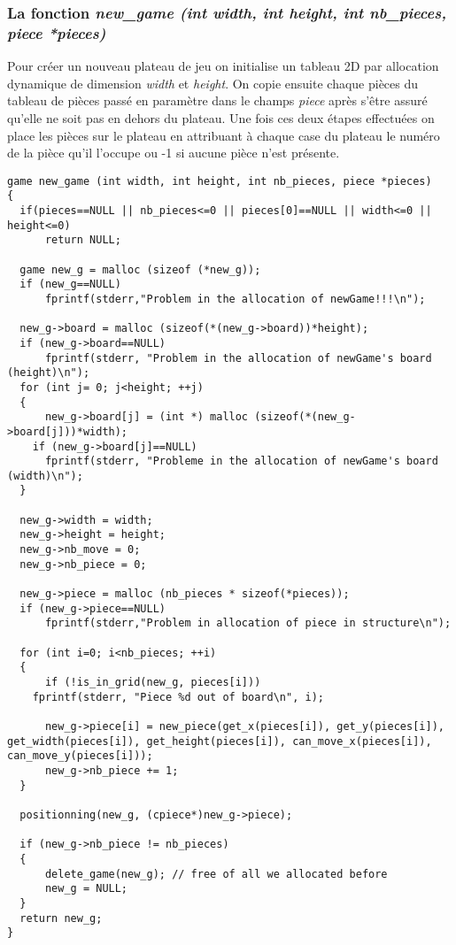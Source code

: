 \documentclass{report}
\begin{document}
\subsubsection{La fonction \textit{new\_game (int width, int height, int nb\_pieces, piece *pieces)}}
Pour créer un nouveau plateau de jeu on initialise un tableau 2D par allocation dynamique de dimension \textit{width} et \textit{height}. On copie ensuite chaque pièces du tableau de pièces passé en paramètre dans le champs \textit{piece} après s'être assuré qu'elle ne soit pas en dehors du plateau. Une fois ces deux étapes effectuées on place les pièces sur le plateau en attribuant à chaque case du plateau le numéro de la pièce qu'il l'occupe ou -1 si aucune pièce n'est présente.
\begin{lstlisting}
game new_game (int width, int height, int nb_pieces, piece *pieces)
{
  if(pieces==NULL || nb_pieces<=0 || pieces[0]==NULL || width<=0 || height<=0)
      return NULL;

  game new_g = malloc (sizeof (*new_g));
  if (new_g==NULL)
      fprintf(stderr,"Problem in the allocation of newGame!!!\n");

  new_g->board = malloc (sizeof(*(new_g->board))*height);
  if (new_g->board==NULL)
      fprintf(stderr, "Problem in the allocation of newGame's board (height)\n");
  for (int j= 0; j<height; ++j)
  {
      new_g->board[j] = (int *) malloc (sizeof(*(new_g->board[j]))*width);
    if (new_g->board[j]==NULL)
      fprintf(stderr, "Probleme in the allocation of newGame's board (width)\n");
  }

  new_g->width = width;
  new_g->height = height;
  new_g->nb_move = 0;
  new_g->nb_piece = 0;

  new_g->piece = malloc (nb_pieces * sizeof(*pieces));
  if (new_g->piece==NULL)
      fprintf(stderr,"Problem in allocation of piece in structure\n");
     
  for (int i=0; i<nb_pieces; ++i)
  {
      if (!is_in_grid(new_g, pieces[i]))
	fprintf(stderr, "Piece %d out of board\n", i);

      new_g->piece[i] = new_piece(get_x(pieces[i]), get_y(pieces[i]), get_width(pieces[i]), get_height(pieces[i]), can_move_x(pieces[i]), can_move_y(pieces[i]));
      new_g->nb_piece += 1;
  }

  positionning(new_g, (cpiece*)new_g->piece);

  if (new_g->nb_piece != nb_pieces)
  {
      delete_game(new_g); // free of all we allocated before
      new_g = NULL;
  }
  return new_g;
}
\end{lstlisting}
\end{document}

